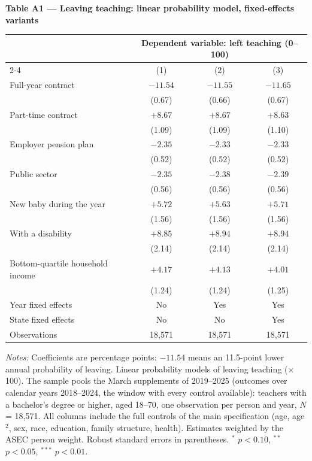 \documentclass[11pt]{article}
\newcommand{\sym}[1]{\rlap{$^{#1}$}}
\begin{document}
\begin{center}
{\large\bfseries Table A1 --- Leaving teaching: linear probability
model, fixed-effects variants}\\[1.0em]
\begin{threeparttable}
\begin{tabular}{lccc}
\toprule
 & \multicolumn{3}{c}{Dependent variable: left teaching (0--100)} \\
\cmidrule(lr){2-4}
 & (1) & (2) & (3) \\
\midrule
Full-year contract & $-11.54$\sym{***} & $-11.55$\sym{***} & $-11.65$\sym{***} \\
 & (0.67) & (0.66) & (0.67) \\[0.2em]
Part-time contract & $+8.67$\sym{***} & $+8.67$\sym{***} & $+8.63$\sym{***} \\
 & (1.09) & (1.09) & (1.10) \\[0.2em]
Employer pension plan & $-2.35$\sym{***} & $-2.33$\sym{***} & $-2.33$\sym{***} \\
 & (0.52) & (0.52) & (0.52) \\[0.2em]
Public sector & $-2.35$\sym{***} & $-2.38$\sym{***} & $-2.39$\sym{***} \\
 & (0.56) & (0.56) & (0.56) \\[0.2em]
New baby during the year & $+5.72$\sym{***} & $+5.63$\sym{***} & $+5.71$\sym{***} \\
 & (1.56) & (1.56) & (1.56) \\[0.2em]
With a disability & $+8.85$\sym{***} & $+8.94$\sym{***} & $+8.94$\sym{***} \\
 & (2.14) & (2.14) & (2.14) \\[0.2em]
Bottom-quartile household income & $+4.17$\sym{***} & $+4.13$\sym{***} & $+4.01$\sym{***} \\
 & (1.24) & (1.24) & (1.25) \\
\midrule
Year fixed effects  & No  & Yes & Yes \\
State fixed effects & No  & No  & Yes \\
Observations        & 18,571 & 18,571 & 18,571 \\
\bottomrule
\end{tabular}
\begin{tablenotes}[flushleft]
\footnotesize
\item \emph{Notes:} Coefficients are percentage points: $-11.54$ means
an 11.5-point lower annual probability of leaving. Linear probability
models of leaving teaching
($\times$100). The sample pools the March supplements of 2019--2025
(outcomes over calendar years 2018--2024, the window with every control
available): teachers with a bachelor's degree or higher, aged 18--70,
one observation per person and year, $N$ = 18,571. All columns include
the full controls of the main specification (age, age$^2$, sex, race,
education, family structure, health). Estimates weighted by the ASEC
person weight. Robust standard errors in parentheses.
$^{*}$ $p<0.10$, $^{**}$ $p<0.05$, $^{***}$ $p<0.01$.
\end{tablenotes}
\end{threeparttable}
\end{center}
\end{document}
